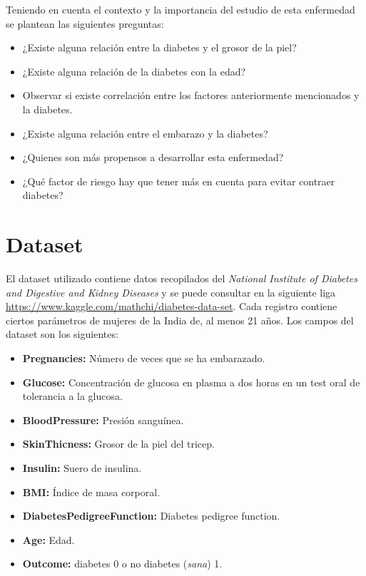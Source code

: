 \documentclass{article}
\begin{document}
Teniendo en cuenta el contexto y la importancia del estudio de esta enfermedad se plantean las siguientes preguntas:
\begin{itemize}
	\item ¿Existe alguna relación entre la diabetes y el grosor de la piel?
	\item ¿Existe alguna relación de la diabetes con la edad?
	\item Observar si existe correlación entre los factores anteriormente mencionados y la diabetes.
	\item ¿Existe alguna relación entre el embarazo y la diabetes?
	\item ¿Quienes son más propensos a desarrollar esta enfermedad?
	\item ¿Qué factor de riesgo hay que tener más en cuenta para evitar contraer diabetes?
\end{itemize}


\section{Dataset}

El dataset utilizado contiene datos recopilados del \emph{National Institute of Diabetes and Digestive and Kidney Diseases} y se puede consultar en la siguiente liga \url{https://www.kaggle.com/mathchi/diabetes-data-set}. Cada registro contiene ciertos parámetros de mujeres de la India de, al menos 21 años. Los campos del dataset son los siguientes:

\begin{itemize}
	\item \textbf{Pregnancies:} Número de veces que se ha embarazado.
	\item \textbf{Glucose:} Concentración de glucosa en plasma a dos horas en un test oral de tolerancia a la glucosa. 
	\item \textbf{BloodPressure:} Presión sanguínea.
	\item \textbf{SkinThicness:} Grosor de la piel del tricep.
	\item \textbf{Insulin:} Suero de insulina.
	\item \textbf{BMI:} Índice de masa corporal.
	\item \textbf{DiabetesPedigreeFunction:} Diabetes pedigree function.
	\item \textbf{Age:} Edad.
	\item \textbf{Outcome:} diabetes 0 o no diabetes (\emph{sana}) 1.
\end{itemize}
\end{document}
